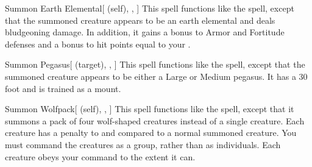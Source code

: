 \lowercase{\hypertarget{spell:Summon Earth Elemental}{}}\label{spell:Summon Earth Elemental}
\begin{attuneability}[Rank 4]{\hypertarget{spell:Summon Earth Elemental}{Summon Earth Elemental}}[ (self), , ]
This spell functions like the  spell, except that the summoned creature appears to be an earth elemental and deals bludgeoning damage.
In addition, it gains a  bonus to Armor and Fortitude defenses and a bonus to hit points equal to your .
\end{attuneability}
\vspace{0.25em}



\lowercase{\hypertarget{spell:Summon Pegasus}{}}\label{spell:Summon Pegasus}
\begin{attuneability}[Rank 5]{\hypertarget{spell:Summon Pegasus}{Summon Pegasus}}[ (target), , ]
This spell functions like the  spell, except that the summoned creature appears to be either a Large or Medium pegasus.
It has a 30 foot  and is trained as a mount.
\end{attuneability}
\vspace{0.25em}



\lowercase{\hypertarget{spell:Summon Wolfpack}{}}\label{spell:Summon Wolfpack}
\begin{attuneability}[Rank 5]{\hypertarget{spell:Summon Wolfpack}{Summon Wolfpack}}[ (self), , ]
This spell functions like the  spell, except that it summons a pack of four wolf-shaped creatures instead of a single creature.
Each creature has a  penalty to  and  compared to a normal summoned creature.
You must command the creatures as a group, rather than as individuals.
Each creature obeys your command to the extent it can.
\end{attuneability}
\vspace{0.25em}



